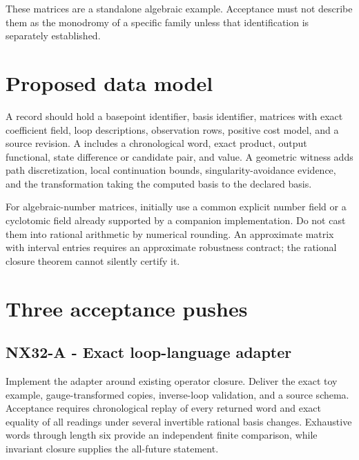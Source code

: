 \documentclass[
  11pt,
  a4paper,
]{report}
\let\nxtexttt\texttt
\renewcommand{\texttt}[1]{\nxtexttt{\seqsplit{#1}}}
\begin{document}
These matrices are a standalone algebraic example. Acceptance must not
describe them as the monodromy of a specific family unless that
identification is separately established.

\hypertarget{proposed-data-model}{%
\section{Proposed data model}\label{proposed-data-model}}

A \texttt{MonodromyLanguage} record should hold a basepoint identifier,
basis identifier, matrices with exact coefficient field, loop
descriptions, observation rows, positive cost model, and a source
revision. A \texttt{LoopWitness} includes a chronological word, exact
product, output functional, state difference or candidate pair, and
value. A geometric witness adds path discretization, local continuation
bounds, singularity-avoidance evidence, and the transformation taking
the computed basis to the declared basis.

For algebraic-number matrices, initially use a common explicit number
field or a cyclotomic field already supported by a companion
implementation. Do not cast them into rational arithmetic by numerical
rounding. An approximate matrix with interval entries requires an
approximate robustness contract; the rational closure theorem cannot
silently certify it.

\hypertarget{three-acceptance-pushes-8}{%
\section{Three acceptance pushes}\label{three-acceptance-pushes-8}}

\hypertarget{nx32-a---exact-loop-language-adapter}{%
\subsection{NX32-A - Exact loop-language
adapter}\label{nx32-a---exact-loop-language-adapter}}

Implement the adapter around existing operator closure. Deliver the
exact toy example, gauge-transformed copies, inverse-loop validation,
and a source schema. Acceptance requires chronological replay of every
returned word and exact equality of all readings under several
invertible rational basis changes. Exhaustive words through length six
provide an independent finite comparison, while invariant closure
supplies the all-future statement.
\end{document}

